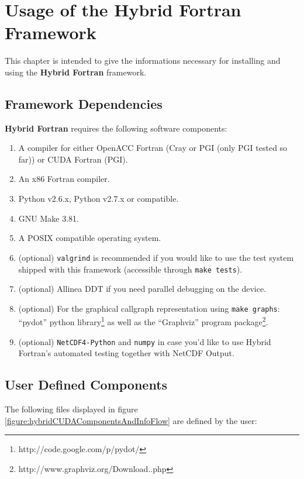 \chapter{Usage of the Hybrid Fortran Framework} \label{cha:usage}

This chapter is intended to give the informations necessary for installing and using the \textbf{Hybrid Fortran} framework.

\section{Framework Dependencies} \label{sec:dependencies}

\textbf{Hybrid Fortran} requires the following software components:

\begin{enumerate}
 \item A compiler for either OpenACC Fortran (Cray or PGI (only PGI tested so far)) or CUDA Fortran (PGI).
 \item An x86 Fortran compiler.
 \item Python v2.6.x, Python v2.7.x or compatible.
 \item GNU Make 3.81.
 \item A POSIX compatible operating system.
 \item (optional) \verb|valgrind| is recommended if you would like to use the test system shipped with this framework (accessible through \verb|make tests|).
 \item (optional) Allinea DDT if you need parallel debugging on the device.
 \item (optional) For the graphical callgraph representation using \verb|make graphs|: ``pydot'' python library\footnote{http://code.google.com/p/pydot/} as well as the ``Graphviz'' program package\footnote{http://www.graphviz.org/Download..php}.
 \item (optional) \verb|NetCDF4-Python| and \verb|numpy| in case you'd like to use Hybrid Fortran's automated testing together with NetCDF Output.
\end{enumerate}

\section{User Defined Components} \label{sub:userDefined}

The following files displayed in figure \ref{figure:hybridCUDAComponentsAndInfoFlow} are defined by the user:

